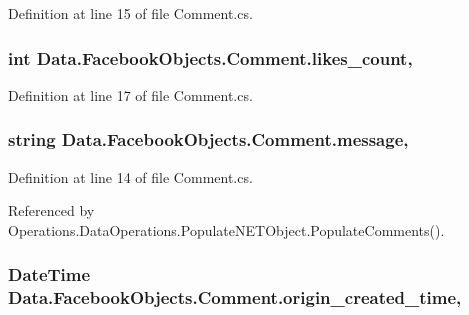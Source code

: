 Definition at line 15 of file Comment.\+cs.

\subsubsection[{\texorpdfstring{likes\+\_\+count}{likes_count}}]{\setlength{\rightskip}{0pt plus 5cm}int Data.\+Facebook\+Objects.\+Comment.\+likes\+\_\+count\hspace{0.3cm}{\ttfamily [get]}, {\ttfamily [set]}}\hypertarget{class_data_1_1_facebook_objects_1_1_comment_a33cbf2ae949c0d355dec05074c23878f}{}\label{class_data_1_1_facebook_objects_1_1_comment_a33cbf2ae949c0d355dec05074c23878f}


Definition at line 17 of file Comment.\+cs.

\subsubsection[{\texorpdfstring{message}{message}}]{\setlength{\rightskip}{0pt plus 5cm}string Data.\+Facebook\+Objects.\+Comment.\+message\hspace{0.3cm}{\ttfamily [get]}, {\ttfamily [set]}}\hypertarget{class_data_1_1_facebook_objects_1_1_comment_a1fa3625f9aab6c29e764659afffead9c}{}\label{class_data_1_1_facebook_objects_1_1_comment_a1fa3625f9aab6c29e764659afffead9c}


Definition at line 14 of file Comment.\+cs.



Referenced by Operations.\+Data\+Operations.\+Populate\+N\+E\+T\+Object.\+Populate\+Comments().

\subsubsection[{\texorpdfstring{origin\+\_\+created\+\_\+time}{origin_created_time}}]{\setlength{\rightskip}{0pt plus 5cm}Date\+Time Data.\+Facebook\+Objects.\+Comment.\+origin\+\_\+created\+\_\+time\hspace{0.3cm}{\ttfamily [get]}, {\ttfamily [set]}}\hypertarget{class_data_1_1_facebook_objects_1_1_comment_a4cd02f87f106d1db97644a8eaf4b2bbb}{}\label{class_data_1_1_facebook_objects_1_1_comment_a4cd02f87f106d1db97644a8eaf4b2bbb}


